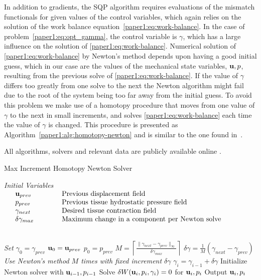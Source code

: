 In addition to gradients, the SQP algorithm requires evaluations of
the mismatch functionals for given values of the control variables,
which again relies on the solution of the work balance
equation~\eqref{paper1:eq:work-balance}. In the case of
problem~\eqref{paper1:eq:opt_gamma}, the control variable is $\gamma$, which
has a large influence on the solution of \eqref{paper1:eq:work-balance}.
Numerical solution of \eqref{paper1:eq:work-balance} by Newton's method
depends upon having a good initial guess, which in our case are the
values of the mechanical state variables, $\mathbf{u}, p$, resulting from
the previous solve of \eqref{paper1:eq:work-balance}. If the value of
$\gamma$ differs too greatly from one solve to the next the Newton
algorithm might fail due to the root of the system being too far away
from the initial guess. To avoid this problem we make use of a
homotopy procedure that moves from one value of $\gamma$ to the next
in small increments, and solves \eqref{paper1:eq:work-balance} each time the
value of $\gamma$ is changed.  This procedure is presented as
Algorithm~\ref{paper1:alg:homotopy-newton} and is similar to the one found
in~\cite{pezzuto2014orthotropic}. 

All algorithms, solvers and relevant data are
publicly available online \cite{OurPackage}.

\begin{algorithm}
\caption{Max Increment Homotopy Newton Solver}
\label{paper1:alg:homotopy-newton}
  \begin{algorithmic}
   \State \emph{Initial Variables}
   \State $\begin{array}{ll}
    \quad \mathbf{u}_{prev} & \quad \quad \quad  \mbox{Previous displacement field} \\
    \quad p_{prev} & \quad \quad \quad  \mbox{Previous tissue hydrostatic pressure field} \\
    \quad \gamma_{next} & \quad \quad \quad  \mbox{Desired tissue contraction field} \\
    \quad \delta \gamma_{max} & \quad \quad \quad  \mbox{Maximum change in a component per Newton solve}
   \end{array}$

   \\
   \State \emph{Set}
   \State \quad $\gamma_0 = \gamma_{prev}$
   \State \quad $\mathbf{u}_0 = \mathbf{u}_{prev}$
   \State \quad  $p_0 = p_{prev}$
   \State \quad  $M = \left \lceil \frac{\|\gamma_{next} - \gamma_{prev}\|_{\infty}}{\delta \gamma_{max}} \right \rceil$
   \State \quad $\delta \gamma = \frac{1}{M}(\gamma_{next} - \gamma_{prev})$
   \\
   \State \emph{Use Newton's method $M$ times with fixed increment $\delta \gamma$}
      \State $\gamma_i = \gamma_{i -1} + \delta \gamma$
      \State Initialize Newton solver with $\mathbf{u}_{i -1}, p_{i -1}$
      \State Solve $\delta W(\mathbf{u}_i, p_i, \gamma_i) = 0$ for $\mathbf{u}_i, p_i$
   \EndFor
   \State Output $\mathbf{u}_i, p_i$
  \end{algorithmic}
\end{algorithm}

